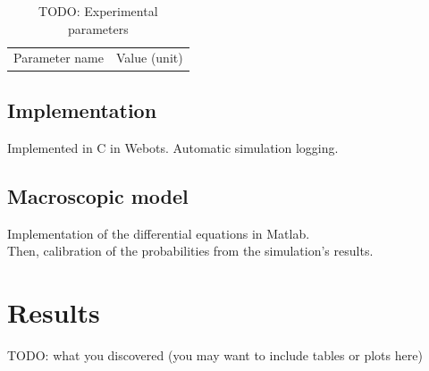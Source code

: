 \documentclass[a4paper, 10pt, conference]{ieeeconf}
\begin{document}
  \begin{table}[h]
    \begin{center}
      \begin{tabular}{r|c}
        Parameter name & Value (unit)
      \end{tabular}
      \caption{TODO: Experimental parameters}
    \end{center}
  \end{table}

  \subsection{Implementation}
  Implemented in C in Webots. Automatic simulation logging.\\

  \subsection{Macroscopic model}
  Implementation of the differential equations in Matlab.\\
  Then, calibration of the probabilities from the simulation's results.

\section{Results}
  TODO: what you discovered (you may want to include tables or plots here)\\
\end{document}
